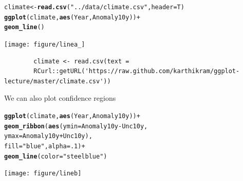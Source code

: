 \documentclass{beamer}\usepackage[]{graphicx}\usepackage[]{color}
\makeatletter
\newcommand{\hlstr}[1]{\textcolor[rgb]{0.192,0.494,0.8}{#1}}%
\newcommand{\hlkwd}[1]{\textcolor[rgb]{0.737,0.353,0.396}{\textbf{#1}}}%
\newenvironment{kframe}{%
 \def\at@end@of@kframe{}%
 \ifinner\ifhmode%
  \def\at@end@of@kframe{\end{minipage}}%
  \begin{minipage}{\columnwidth}%
 \fi\fi%
 \def\FrameCommand##1{\hskip\@totalleftmargin \hskip-\fboxsep
 \colorbox{shadecolor}{##1}\hskip-\fboxsep
     \hskip-\linewidth \hskip-\@totalleftmargin \hskip\columnwidth}%
 \MakeFramed {\advance\hsize-\width
   \@totalleftmargin\z@ \linewidth\hsize
   \@setminipage}}%
 {\par\unskip\endMakeFramed%
 \at@end@of@kframe}
\newenvironment{knitrout}{}{} %
\makeatother
\begin{document}
\begin{frame}[fragile]


\begin{knitrout}\footnotesize
{}\color{fgcolor}\begin{kframe}
\begin{alltt}
climate <- \hlkwd{read.csv}(\hlstr{"../data/climate.csv"}, header = T)
\hlkwd{ggplot}(climate, \hlkwd{aes}(Year, Anomaly10y)) +
\hlkwd{geom_line}()
\end{alltt}
\end{kframe}

{\centering \texttt{[image: figure/linea\_]} 

}



\end{knitrout}

\begin{flushright}
\begingroup
    \fontsize{6pt}{12pt}\selectfont
    \begin{verbatim}
        climate <- read.csv(text =
        RCurl::getURL('https://raw.github.com/karthikram/ggplot-lecture/master/climate.csv'))
    \end{verbatim}
\endgroup
\end{flushright}
\end{frame}


\begin{frame}[fragile]
We can also plot confidence regions
\begin{knitrout}\footnotesize
{}\color{fgcolor}\begin{kframe}
\begin{alltt}
\hlkwd{ggplot}(climate, \hlkwd{aes}(Year, Anomaly10y)) +
\hlkwd{geom_ribbon}(\hlkwd{aes}(ymin = Anomaly10y - Unc10y,
ymax = Anomaly10y + Unc10y),
fill = \hlstr{"blue"}, alpha = .1) +
\hlkwd{geom_line}(color = \hlstr{"steelblue"})
\end{alltt}
\end{kframe}

{\centering \texttt{[image: figure/lineb]} 

}



\end{knitrout}

\end{frame}
\end{document}
